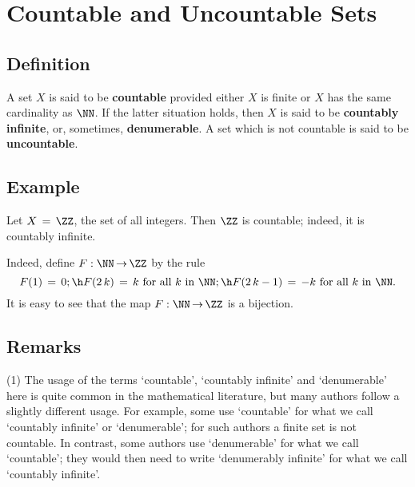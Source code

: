 \VV

                        \section{Countable and Uncountable Sets}
                        \label{SectA20}

            \subsection{\small{\bf Definition}}
            \label{DefA20.30}

        A set $X$ is said to be {\bf countable} provided either $X$ is finite or $X$ has the same cardinality as ${\NN}$.
    If the latter situation holds, then $X$ is said to be {\bf countably infinite}, or, sometimes, {\bf denumerable}.
    A set which is not countable is said to be {\bf uncountable}.

\V

        \subsection{\small{{\bf Example}}}
        \label{ExampA20.30}

        Let $X \,=\, {\ZZ}$, the set of all integers. Then ${\ZZ}$ is countable; indeed, it is countably infinite.

        Indeed, define $F:{\NN} \,{\rightarrow}\, {\ZZ}$ by the rule
        \begin{displaymath}
        F(1) \,=\, 0; \h F(2\,k) \,=\, k \mbox{ for all $k$ in ${\NN}$};
    \h F(2\,k-1) \,=\, -k \mbox{ for all $k$ in ${\NN}$}.
        \end{displaymath}
    It is easy to see that the map $F:{\NN} \,{\rightarrow}\, {\ZZ}$ is a bijection.


\V

            \subsection{\small{\bf Remarks}}
            \label{RemrkA20.40}

\hspace*{\parindent}(1) The usage of the terms `countable', `countably infinite' and `denumerable' here is quite common in the mathematical literature,
    but many authors follow a slightly different usage. For example, some use `countable' for what we call `countably infinite' or `denumerable';
    for such authors a finite set is not countable. In contrast, some authors use `denumerable' for what we call `countable';
    they would then need to write `denumerably infinite' for what we call `countably infinite'.

